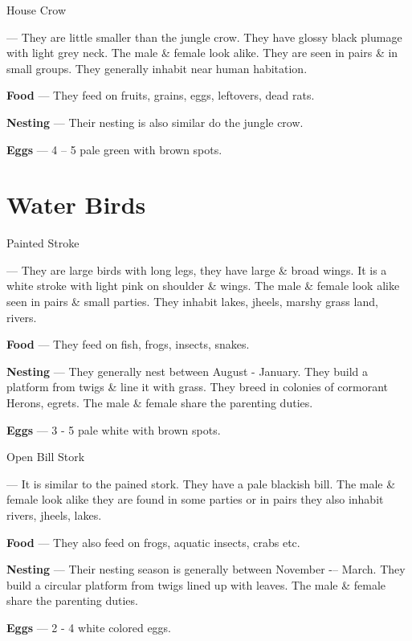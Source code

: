 \begin{bird}{House Crow}

 --- They are little smaller than the jungle crow. They have glossy black plumage with light grey neck. The male \& female look alike. They are seen in pairs \& in small groups. They generally inhabit near human habitation.

{\large\bf Food} --- They feed on fruits, grains, eggs, leftovers, dead rats.

{\large\bf Nesting} --- Their nesting is also similar do the jungle crow.

{\large\bf Eggs} --- 4 -- 5 pale green with brown spots.
\end{bird}

\part{Water Birds}

\begin{bird}{Painted Stroke}

 --- They are large birds with long legs, they have large \& broad wings. It is a white stroke with light pink on shoulder \& wings. The male \& female look alike seen in pairs \& small parties. They inhabit lakes, jheels, marshy grass land, rivers.

{\large\bf Food} --- They feed on fish, frogs, insects, snakes.

{\large\bf Nesting} --- They generally nest between August - January. They build a platform from twigs \& line it with grass. They breed in colonies of cormorant Herons, egrets. The male \& female share the parenting duties.

{\large\bf Eggs} --- 3 - 5 pale white with brown spots.
\end{bird}

\begin{bird}{Open Bill Stork}

 --- It is similar to the pained stork. They have a pale blackish bill. The male \& female look alike they are found in some parties or in pairs they also inhabit rivers, jheels, lakes.

{\large\bf Food} --- They also feed on frogs, aquatic insects, crabs etc.

{\large\bf Nesting} --- Their nesting season is generally between November -– March. They build a circular platform from twigs lined up with leaves. The male \& female share the parenting duties. 

{\large\bf Eggs} --- 2 - 4 white colored eggs.
\end{bird}


